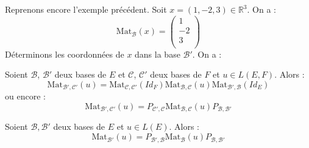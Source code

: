 \documentclass[french,11pt,twoside]{VcCours}
\begin{document}
\begin{Exemple} Reprenons encore l'exemple précédent. Soit $x=(1,-2,3) \in \mathbb{R}^3$. On a :
$$ \textrm{Mat}_{\mathcal{B}}(x) = \begin{pmatrix}
1 \\
-2 \\
3 \\
\end{pmatrix}$$
Déterminons les coordonnées de $x$ dans la base $\mathcal{B}'$. On a :

\vspace{4cm}
\end{Exemple}

\begin{Theoreme}{} Soient $\mathcal{B}$, $\mathcal{B}'$ deux bases de $E$ et $\mathcal{C}$, $\mathcal{C}'$ deux bases de $F$ et $u \in L(E,F)$. Alors :
$$ \textrm{Mat}_{\mathcal{B}', \mathcal{C}'}(u) = \textrm{Mat}_{\mathcal{C}, \mathcal{C}'}(Id_F)  \textrm{Mat}_{\mathcal{B}, \mathcal{C}}(u) \textrm{Mat}_{\mathcal{B}', \mathcal{B}}(Id_E)$$
ou encore :
$$ \textrm{Mat}_{\mathcal{B}', \mathcal{C}'}(u) = P_{\mathcal{C}', \mathcal{C}}  \textrm{Mat}_{\mathcal{B}, \mathcal{C}}(u)  P_{\mathcal{B}, \mathcal{B}'}$$
\end{Theoreme}

\begin{Corollaire}{} Soient $\mathcal{B}, \mathcal{B}'$ deux bases de $E$ et $u \in L(E)$. Alors :
$$ \textrm{Mat}_{\mathcal{B}'}(u) = P_{\mathcal{B}', \mathcal{B}}  \textrm{Mat}_{\mathcal{B}}(u)  P_{\mathcal{B}, \mathcal{B}'}$$
\end{Corollaire}
\end{document}
